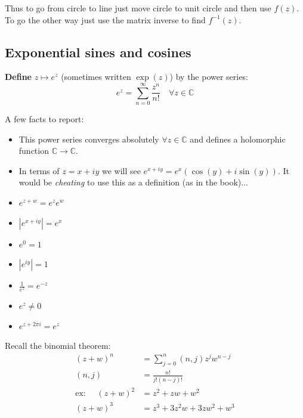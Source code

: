 \documentclass[a4paper, 11pt]{article}
\begin{document}
\noindent Thus to go from circle to line just move circle to unit circle and then use $f(z)$. To go the other way just use the matrix inverse to find $f^{-1}(z)$. \\

\subsection*{Exponential sines and cosines}
\textbf{Define} $z\mapsto e^{z}$ (sometimes written $\exp(z)$) by the power series: 
	\begin{equation*}
		e^{z} = \sum_{n=0}^\infty \frac{z^n}{n!} \quad \forall z\in\mathbb{C}
	\end{equation*}

A few facts to report:
	\begin{itemize}
		\item This power series converges absolutely $\forall z \in \mathbb{C}$ and defines a holomorphic function $\mathbb{C}\rightarrow \mathbb{C}$.
		
		\item In terms of $z=x+iy$ we will see $e^{x+iy} = e^x(\cos(y)+i\sin(y))$. It would be \textit{cheating} to use this as a definition (as in the book)...
		
		\item $e^{z+w}=e^ze^w$ 
		
		\item $|e^{x+iy}| = e^x$ 
		
		\item $e^0 = 1$ 
		
		\item $|e^{iy}|=1$ 
		
		\item $\frac{1}{e^z} = e^{-z}$ 
		
		\item $e^z \neq 0$ 
		
		\item $e^{z+2\pi i} = e^z$ 
	
	\end{itemize}

Recall the binomial theorem: 
	\begin{align*}
		(z+w)^n &= \sum_{j=0}^n (n,j)z^jw^{n-j} \\ 
		(n,j) &= \frac{n!}{j!(n-j)!} \\ 
		\text{ex: } \quad (z+w)^2 &= z^2+zw+w^2 \\ 
			(z+w)^3 &= z^3 + 3z^2w + 3zw^2 + w^3 
	\end{align*}
\end{document}
